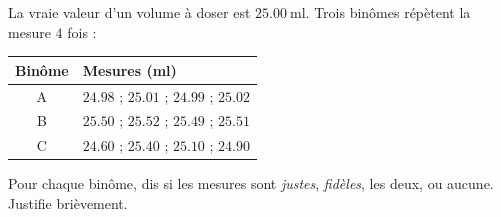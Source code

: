 \documentclass[11pt,a4paper]{article}
\begin{document}
\begin{exo}
La vraie valeur d'un volume à doser est $\qty{25,00}{\milli\litre}$. Trois binômes répètent la mesure
$4$ fois :
\begin{center}\small\renewcommand{\arraystretch}{1.15}
\begin{tabular}{c l}
\toprule
\textbf{Binôme} & \textbf{Mesures (\si{\milli\litre})}\\
\midrule
A & $\num{24,98}$ ; $\num{25,01}$ ; $\num{24,99}$ ; $\num{25,02}$\\
B & $\num{25,50}$ ; $\num{25,52}$ ; $\num{25,49}$ ; $\num{25,51}$\\
C & $\num{24,60}$ ; $\num{25,40}$ ; $\num{25,10}$ ; $\num{24,90}$\\
\bottomrule
\end{tabular}
\end{center}
Pour chaque binôme, dis si les mesures sont \emph{justes}, \emph{fidèles}, les deux, ou aucune.
Justifie brièvement.
\end{exo}
\end{document}
